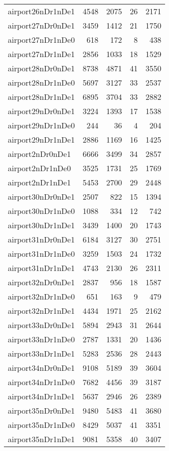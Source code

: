 \begin{longtable}{lrrrr}
airport26nDr1nDe1 & 4548 & 2075 & 26 & 2171 \\
airport27nDr0nDe1 & 3459 & 1412 & 21 & 1750 \\
airport27nDr1nDe0 & 618 & 172 & 8 & 438 \\
airport27nDr1nDe1 & 2856 & 1033 & 18 & 1529 \\
airport28nDr0nDe1 & 8738 & 4871 & 41 & 3550 \\
airport28nDr1nDe0 & 5697 & 3127 & 33 & 2537 \\
airport28nDr1nDe1 & 6895 & 3704 & 33 & 2882 \\
airport29nDr0nDe1 & 3224 & 1393 & 17 & 1538 \\
airport29nDr1nDe0 & 244 & 36 & 4 & 204 \\
airport29nDr1nDe1 & 2886 & 1169 & 16 & 1425 \\
airport2nDr0nDe1 & 6666 & 3499 & 34 & 2857 \\
airport2nDr1nDe0 & 3525 & 1731 & 25 & 1769 \\
airport2nDr1nDe1 & 5453 & 2700 & 29 & 2448 \\
airport30nDr0nDe1 & 2507 & 822 & 15 & 1394 \\
airport30nDr1nDe0 & 1088 & 334 & 12 & 742 \\
airport30nDr1nDe1 & 3439 & 1400 & 20 & 1743 \\
airport31nDr0nDe1 & 6184 & 3127 & 30 & 2751 \\
airport31nDr1nDe0 & 3259 & 1503 & 24 & 1732 \\
airport31nDr1nDe1 & 4743 & 2130 & 26 & 2311 \\
airport32nDr0nDe1 & 2837 & 956 & 18 & 1587 \\
airport32nDr1nDe0 & 651 & 163 & 9 & 479 \\
airport32nDr1nDe1 & 4434 & 1971 & 25 & 2162 \\
airport33nDr0nDe1 & 5894 & 2943 & 31 & 2644 \\
airport33nDr1nDe0 & 2787 & 1331 & 20 & 1436 \\
airport33nDr1nDe1 & 5283 & 2536 & 28 & 2443 \\
airport34nDr0nDe1 & 9108 & 5189 & 39 & 3604 \\
airport34nDr1nDe0 & 7682 & 4456 & 39 & 3187 \\
airport34nDr1nDe1 & 5637 & 2946 & 26 & 2389 \\
airport35nDr0nDe1 & 9480 & 5483 & 41 & 3680 \\
airport35nDr1nDe0 & 8429 & 5037 & 41 & 3351 \\
airport35nDr1nDe1 & 9081 & 5358 & 40 & 3407 \\

\end{longtable}
